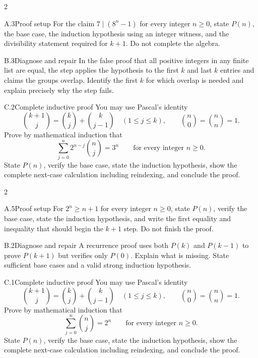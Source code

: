 \documentclass[9pt]{extarticle}
\begin{document}
\CoreWorkArea
\FormBreak
{}
\begin{multicols}{2}
\begin{CompactCoreProblem}{A.3}{Proof setup}
For the claim $7\mid(8^n-1)$ for every integer $n\ge0$, state $P(n)$, the base case, the induction hypothesis using an integer witness, and the divisibility statement required for $k+1$. Do not complete the algebra.
\end{CompactCoreProblem}
\begin{CompactCoreProblem}{B.3}{Diagnose and repair}
In the false proof that all positive integers in any finite list are equal, the step applies the hypothesis to the first $k$ and last $k$ entries and claims the groups overlap. Identify the first $k$ for which overlap is needed and explain precisely why the step fails.
\end{CompactCoreProblem}
\end{multicols}
\begin{CompactCoreProblem}{C.2}{Complete inductive proof}
You may use Pascal's identity
\[
\binom{k+1}{j}=\binom{k}{j}+\binom{k}{j-1}
\quad(1\le j\le k),\qquad
\binom{n}{0}=\binom{n}{n}=1.
\]
Prove by mathematical induction that
\[
\sum_{j=0}^{n} 2^{n-j}\binom{n}{j}=3^n\qquad\text{for every integer }n\ge0.
\]
State $P(n)$, verify the base case, state the induction hypothesis, show the complete next-case calculation including reindexing, and conclude the proof.
\end{CompactCoreProblem}
\CoreWorkArea
\FormBreak
{}
\begin{multicols}{2}
\begin{CompactCoreProblem}{A.5}{Proof setup}
For $2^n\ge n+1$ for every integer $n\ge0$, state $P(n)$, verify the base case, state the induction hypothesis, and write the first equality and inequality that should begin the $k+1$ step. Do not finish the proof.
\end{CompactCoreProblem}
\begin{CompactCoreProblem}{B.2}{Diagnose and repair}
A recurrence proof uses both $P(k)$ and $P(k-1)$ to prove $P(k+1)$ but verifies only $P(0)$. Explain what is missing. State sufficient base cases and a valid strong induction hypothesis.
\end{CompactCoreProblem}
\end{multicols}
\begin{CompactCoreProblem}{C.1}{Complete inductive proof}
You may use Pascal's identity
\[
\binom{k+1}{j}=\binom{k}{j}+\binom{k}{j-1}
\quad(1\le j\le k),\qquad
\binom{n}{0}=\binom{n}{n}=1.
\]
Prove by mathematical induction that
\[
\sum_{j=0}^{n}\binom{n}{j}=2^n\qquad\text{for every integer }n\ge0.
\]
State $P(n)$, verify the base case, state the induction hypothesis, show the complete next-case calculation including reindexing, and conclude the proof.
\end{CompactCoreProblem}
\end{document}
